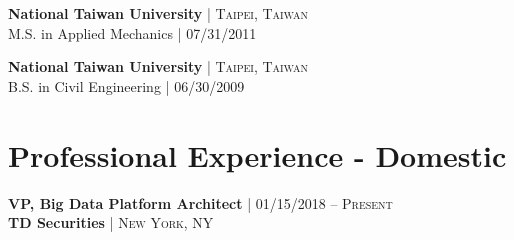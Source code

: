 \documentclass[10pt]{article} %
\begin{document}
{\begin{minipage}[t]{0.5\textwidth}
	 

\textbf{National Taiwan University} {\hfill\footnotesize\textsc{| Taipei, Taiwan}}\\
M.S. in Applied Mechanics {\hfill\footnotesize\textsc{| 07/31/2011}}
	 

\textbf{National Taiwan University} {\hfill\footnotesize\textsc{| Taipei, Taiwan}}\\
B.S. in Civil Engineering {\hfill\footnotesize\textsc{| 06/30/2009}}
	




\section{Professional Experience - Domestic} 




{\raggedright\normalsize
\textbf{VP, Big Data Platform Architect} {\hfill\footnotesize\textsc{| 01/15/2018 -- Present}}\\ 
\textbf{TD Securities} {\hfill\footnotesize\textsc{| New York, NY}}}


\end{minipage}}
\end{document}

